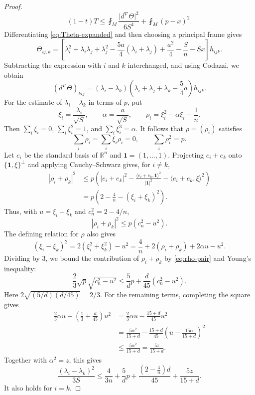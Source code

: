 \documentclass[10pt,a4paper]{amsart}
\numberwithin{equation}{section}
\newcommand{\ip}[2]{\langle #1,#2\rangle}
\newcommand{\norm}[1]{\lvert #1\rvert}
\begin{document}
\begin{proof}
\begin{equation}\label{eq:T-Weitz-final}
(1-t)T\le
\fint_M\frac{\norm{d^\nabla\Theta}^2}{6S^4}
+\fint_M(p-x)^2.
\end{equation}
Differentiating \eqref{eq:Theta-expanded} and then choosing a principal frame gives
\[
\Theta_{ij,k}
=\left[\lambda_i^2+\lambda_i\lambda_j+\lambda_j^2
-\frac{5a}{4}(\lambda_i+\lambda_j)
+\frac{a^2}{4}-\frac Sn-Sx\right]h_{ijk}.
\]
Subtracting the expression with $i$ and $k$ interchanged, and using Codazzi,
we obtain
\[
(d^\nabla\Theta)_{kij}
=(\lambda_i-\lambda_k)
\left(\lambda_i+\lambda_j+\lambda_k-\frac54a\right)h_{ijk}.
\]
For the estimate of $\lambda_i-\lambda_k$ in terms of $p$, put
\[
\xi_i=\frac{\lambda_i}{\sqrt S},
\qquad
\alpha=\frac a{\sqrt S},
\qquad
\rho_i=\xi_i^2-\alpha\xi_i-\frac1n.
\]
Then $\sum_i\xi_i=0$, $\sum_i\xi_i^2=1$, and $\sum_i\xi_i^3=\alpha$.
It follows that $\rho=(\rho_i)$ satisfies
\[
\sum_i\rho_i=\sum_i\xi_i\rho_i=0,
\qquad \sum_i\rho_i^2=p.
\]
Let $e_i$ be the standard basis of $\mathbb R^n$ and $\mathbf1=(1,\ldots,1)$. Projecting $e_i+e_k$ onto $\{\mathbf1,\xi\}^{\perp}$ and applying Cauchy--Schwarz gives, for $i\ne k$,
\begin{align*}
|\rho_i+\rho_k|^2
&\le p\left(\norm{e_i+e_k}^2
-\frac{\ip{e_i+e_k}{\mathbf1}^2}{\norm{\mathbf1}^2}
-\ip{e_i+e_k}{\xi}^2\right)\\
&=p\left(2-\frac4n-(\xi_i+\xi_k)^2\right).
\end{align*}
Thus, with $u=\xi_i+\xi_k$ and $c_n^2=2-4/n$,
\begin{equation}\label{eq:rho-pair}
|\rho_i+\rho_k|^2\le p(c_n^2-u^2).
\end{equation}
The defining relation for $\rho$ also gives
\[
(\xi_i-\xi_k)^2
=2(\xi_i^2+\xi_k^2)-u^2
=\frac4n+2(\rho_i+\rho_k)+2\alpha u-u^2.
\]
Dividing by $3$, we bound the contribution of $\rho_i+\rho_k$ by \eqref{eq:rho-pair} and Young's inequality:
\[
\frac23\sqrt p\sqrt{c_n^2-u^2}
\le\frac5d p+\frac d{45}(c_n^2-u^2).
\]
Here $2\sqrt{(5/d)(d/45)}=2/3$. For the remaining terms, completing the square gives
\begin{align*}
\frac23\alpha u-\left(\frac13+\frac d{45}\right)u^2
&=\frac23\alpha u-\frac{15+d}{45}u^2\\
&=\frac{5\alpha^2}{15+d}
-\frac{15+d}{45}
\left(u-\frac{15\alpha}{15+d}\right)^2\\
&\le\frac{5\alpha^2}{15+d}
=\frac{5z}{15+d}.
\end{align*}
Together with $\alpha^2=z$, this gives
\begin{equation}\label{eq:pairwise-final}
\frac{(\lambda_i-\lambda_k)^2}{3S}
\le \frac4{3n}+\frac5d p
+\frac{(2-\frac4n)d}{45}+\frac{5z}{15+d}.
\end{equation}
It also holds for $i=k$.


\end{proof}
\end{document}
